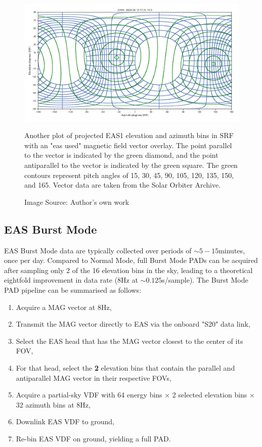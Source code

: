 \begin{figure}[h!]
    \centering
    \centerfloat
    \includegraphics[width=1.05\linewidth]{figures/fullcontours_justeas_noselection.png}
    \caption{Another plot of projected EAS1 elevation and azimuth bins in SRF with an "eas used" magnetic field vector overlay. The point parallel to the vector is indicated by the green diamond, and the point antiparallel to the vector is indicated by the green square. The green contours represent pitch angles of 15\degree, 30\degree, 45\degree, 90\degree, 105\degree, 120\degree, 135\degree, 150\degree, and 165\degree. Vector data are taken from the Solar Orbiter Archive. }
    \caption*{Image Source: Author's own work}
    \label{fig: normal - full contours}
\end{figure}


\newpage
\subsection{EAS Burst Mode} \label{EAS Burst Mode}

EAS Burst Mode data are typically collected over periods of \(\sim5-15\)minutes, once per day. Compared to Normal Mode, full Burst Mode PADs can be acquired after sampling only 2 of the 16 elevation bins in the sky, leading to a theoretical eightfold improvement in data rate (8Hz at \(\sim0.125\)s/sample). The Burst Mode PAD pipeline can be summarised as follows\cite{owen2021}:

\begin{enumerate}
    \item Acquire a MAG vector at 8Hz,
    \item Transmit the MAG vector directly to EAS via the onboard "S20" data link,
    \item Select the EAS head that has the MAG vector closest to the center of its FOV,
    \item For that head, select the \textbf{2} elevation bins that contain the parallel and antiparallel MAG vector in their respective FOVs,
    \item Acquire a partial-sky VDF with 64 energy bins \(\times\) 2 selected elevation bins \(\times\) 32 azimuth bins at 8Hz,
    \item Downlink EAS VDF to ground,
    \item Re-bin EAS VDF on ground, yielding a full PAD.
\end{enumerate}

